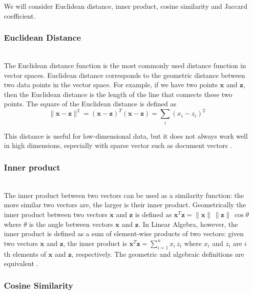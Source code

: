We will consider Euclidean distance, inner product, cosine similarity and 
Jaccard coefficient.


\subsubsection{Euclidean Distance} \ \\

The Euclidean distance function is the most commonly used distance
function in vector spaces. Euclidean distance corresponds to
the geometric distance between two data points in the vector space.
For example, if we have two points $\mathbf x$ and
$\mathbf z$, then the Euclidean distance is the
length of the line that connects these two points.
The square of the Euclidean distance is defined as
$$\| \mathbf x - \mathbf z \|^2 = (\mathbf x - \mathbf z)^T (\mathbf x - \mathbf z)  =\sum_i (x_i - z_i)^2$$

This distance is useful for low-dimensional data, but it does not always work 
well in high dimensions, especially with sparse vector such as 
document vectors \cite{ertoz2003finding}.


\subsubsection{Inner product} \ \\

The inner product between two vectors can be used as a similarity function:
the more similar two vectors are, the larger is their inner product.
Geometrically the inner product between two vectors $\mathbf x$ and $\mathbf z$
is defined as
$\mathbf x^T \mathbf z = \|\mathbf x \| \, \| \mathbf z \| \, \cos \theta$
where $\theta$ is the angle between vectors $\mathbf x$ and $\mathbf z$.
In Linear Algebra, however, the inner product
is defined as a sum of element-wise products of two vectors:
given two vectors $\mathbf x$ and $\mathbf z$, the inner product is
$\mathbf x^T \mathbf z = \sum_{i = 1}^n x_i \, z_i$ where $x_i$ and $z_i$
are $i$th elements of $\mathbf x$ and $\mathbf z$, respectively.
The geometric and algebraic definitions are equivalent \cite{huges2013calculus}.



\subsubsection{Cosine Similarity} \ \\


